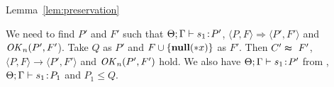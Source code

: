 \begin{pfof}{Lemma~\ref{lem:preservation}}
\begin{itemize}
  We need to find \(P'\) and \(F'\) such that \(\Theta;\Gamma \vdash
  s_1 \!:\! P'\), \( \langle P, F \rangle \Longrightarrow \langle P',
  F' \rangle\) and \(\mathit{OK}_n(P', F'\)). Take \(Q\) as \(P'\) and \(F\cup
  \{{\bf null}(*x)\}\) as \(F'\). Then \(C' \thickapprox\ F'\), \( \langle P,F
  \rangle \rightarrow \langle P', F' \rangle\) and \(\mathit{OK}_n(P', F')\)
  hold.  We also have \(\Theta; \Gamma \vdash s_1 \!:\! P'\) from
  , \(\Theta; \Gamma \vdash s_1 \!:\! P_1\) and \( P_1 \le
  Q\).










\end{itemize}
\end{pfof}
